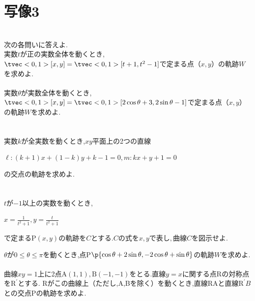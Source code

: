 \documentclass[10pt,fleqn,a4paper]{jsarticle}
\newcommand{\ans}[1]{\mbox{\boldmath{$#1$}}}
\begin{document}
\section{写像3}
\noindent{}\\
次の各問いに答えよ.\\
\kakkoichi$実数t$が正の実数全体を動くとき,$\tvec<0,1>[x,y]=\tvec<0,1>[t+1,t^2-1]$で定まる点$（x,y）$の軌跡$W$を求めよ.\\\\
\kakkoni 実数$\theta$が実数全体を動くとき,$\tvec<0,1>[x,y]=\tvec<0,1>[2\cos\theta+3,2\sin\theta-1]$で定まる点$（x,y）$の軌跡$W$を求めよ.\\\\
\\
実数$k$が全実数を動くとき,$xy$平面上の2つの直線
\begin{center}
    $\ell:(k+1)x+(1-k)y+k-1=0,　m:kx+y+1=0$
\end{center}
の交点の軌跡を求めよ.\\\\
\\
$t$が$-1$以上の実数を動くとき,
\begin{center}
    $x=\frac{1}{t^2+1},　y=\frac{t}{t^2+1}$
\end{center}
で定まるP$(x,y)$の軌跡を$C$とする.$Cの式をx,yで表し,曲線Cを図示せよ.$
\newpage
\begin{center}
    \ans{19章の問題演習}
\end{center}
\noindent\reibanichi$\theta$が$0\leq\theta\leq\pi$を動くとき,点P$\p{\cos\theta+2\sin\theta,-2\cos\theta+\sin\theta}$の軌跡$W$を求めよ.\\\\
\reibanni 曲線$xy=1$上に2点$\mathrm{A}(1,1),\mathrm{B}(-1,-1)$をとる.直線$y=x$に関する点Rの対称点を$\mathrm{R}^\prime$とする.
Rがこの曲線上（ただし,A,Bを除く）を動くとき,直線RAと直線$\mathrm{R}^\prime B$との交点Pの軌跡を求めよ.
\newpage
\end{document}
